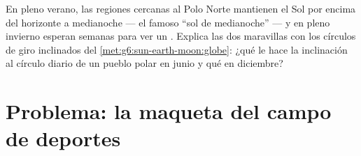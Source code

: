 \begin{exercise}[$\star\star\star$]\label{exo:g6:sun-earth-moon:12}
En pleno verano, las regiones cercanas al Polo Norte mantienen el Sol
por encima del horizonte a medianoche --- el famoso ``sol de
medianoche'' --- y en pleno invierno esperan semanas para ver un
. Explica las dos maravillas con los círculos de giro
inclinados del \cref{met:g6:sun-earth-moon:globe}: ¿qué le hace la
inclinación al círculo diario de un pueblo polar en junio y qué en
diciembre?
\end{exercise}

\section{Problema: la maqueta del campo de deportes}

